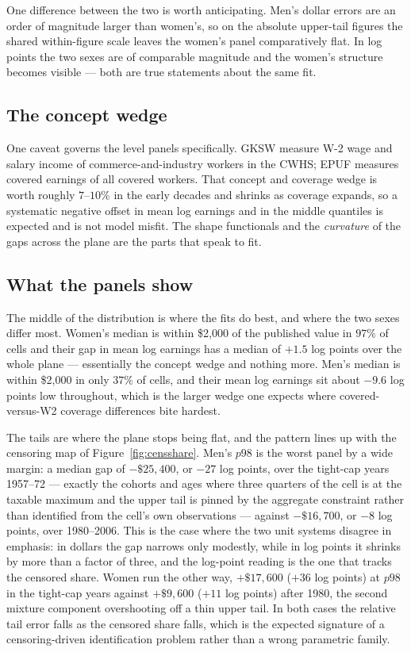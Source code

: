 \documentclass[11pt]{article}
\begin{document}
One difference between the two is worth anticipating. Men's dollar errors are an order of
magnitude larger than women's, so on the absolute upper-tail figures the shared
within-figure scale leaves the women's panel comparatively flat. In log points the two
sexes are of comparable magnitude and the women's structure becomes visible --- both are
true statements about the same fit.

\subsection*{The concept wedge}

One caveat governs the level panels specifically. GKSW measure W-2 wage and salary income
of commerce-and-industry workers in the CWHS; EPUF measures covered earnings of all
covered workers. That concept and coverage wedge is worth roughly $7$--$10\%$ in the early
decades and shrinks as coverage expands, so a systematic negative offset in mean log
earnings and in the middle quantiles is expected and is not model misfit. The shape
functionals and the \emph{curvature} of the gaps across the plane are the parts that
speak to fit.

\subsection*{What the panels show}

The middle of the distribution is where the fits do best, and where the two sexes differ
most. Women's median is within \$2{,}000 of the published value in $97\%$ of cells and
their gap in mean log earnings has a median of $+1.5$ log points over the whole plane ---
essentially the concept wedge and nothing more. Men's median is within \$2{,}000 in only
$37\%$ of cells, and their mean log earnings sit about $-9.6$ log points low throughout,
which is the larger wedge one expects where covered-versus-W2 coverage differences bite
hardest.

The tails are where the plane stops being flat, and the pattern lines up with the
censoring map of Figure~\ref{fig:censshare}. Men's $p98$ is the worst panel by a wide
margin: a median gap of $-\$25{,}400$, or $-27$ log points, over the tight-cap years
1957--72 --- exactly the cohorts and ages where three quarters of the cell is at the
taxable maximum and the upper tail is pinned by the aggregate constraint rather than
identified from the cell's own observations --- against $-\$16{,}700$, or $-8$ log
points, over 1980--2006. This is the case where the two unit systems disagree in
emphasis: in dollars the gap narrows only modestly, while in log points it shrinks by
more than a factor of three, and the log-point reading is the one that tracks the
censored share. Women run the other way, $+\$17{,}600$ ($+36$ log points) at $p98$ in the
tight-cap years against $+\$9{,}600$ ($+11$ log points) after 1980, the second mixture
component overshooting off a thin upper tail. In both cases the relative tail error falls
as the censored share falls, which is the expected signature of a censoring-driven
identification problem rather than a wrong parametric family.
\end{document}

